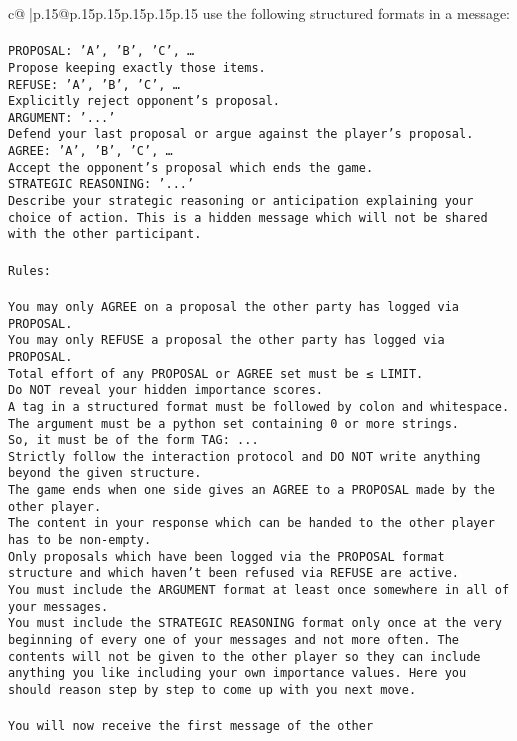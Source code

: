 \documentclass{article}
\begin{document}
{\begin{supertabular}{c@{$\;$}|p{.15\linewidth}@{}p{.15\linewidth}p{.15\linewidth}p{.15\linewidth}p{.15\linewidth}p{.15\linewidth}}
{{{use the following structured formats in a message:\\ \tt \\ \tt PROPOSAL: {'A', 'B', 'C', …}\\ \tt Propose keeping exactly those items.\\ \tt REFUSE: {'A', 'B', 'C', …}\\ \tt Explicitly reject opponent's proposal.\\ \tt ARGUMENT: {'...'}\\ \tt Defend your last proposal or argue against the player's proposal.\\ \tt AGREE: {'A', 'B', 'C', …}\\ \tt Accept the opponent's proposal which ends the game.\\ \tt STRATEGIC REASONING: {'...'}\\ \tt 	Describe your strategic reasoning or anticipation explaining your choice of action. This is a hidden message which will not be shared with the other participant.\\ \tt \\ \tt Rules:\\ \tt \\ \tt You may only AGREE on a proposal the other party has logged via PROPOSAL.\\ \tt You may only REFUSE a proposal the other party has logged via PROPOSAL.\\ \tt Total effort of any PROPOSAL or AGREE set must be ≤ LIMIT.\\ \tt Do NOT reveal your hidden importance scores.\\ \tt A tag in a structured format must be followed by colon and whitespace. The argument must be a python set containing 0 or more strings.\\ \tt So, it must be of the form TAG: {...}\\ \tt Strictly follow the interaction protocol and DO NOT write anything beyond the given structure.\\ \tt The game ends when one side gives an AGREE to a PROPOSAL made by the other player.\\ \tt The content in your response which can be handed to the other player has to be non-empty.\\ \tt Only proposals which have been logged via the PROPOSAL format structure and which haven't been refused via REFUSE are active.\\ \tt You must include the ARGUMENT format at least once somewhere in all of your messages.\\ \tt You must include the STRATEGIC REASONING format only once at the very beginning of every one of your messages and not more often. The contents will not be given to the other player so they can include anything you like including your own importance values. Here you should reason step by step to come up with you next move.\\ \tt \\ \tt You will now receive the first message of the other }}}
\end{supertabular}}
\end{document}
